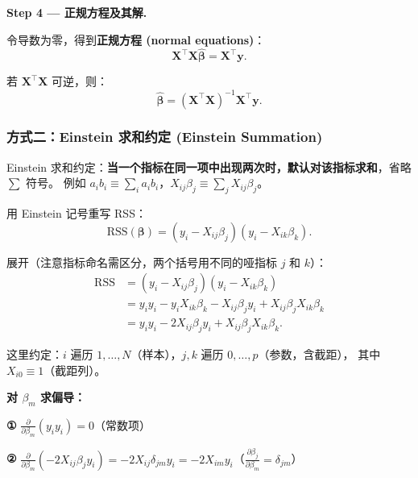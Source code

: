 \medskip
\textbf{Step 4 --- 正规方程及其解.}

令导数为零，得到\textbf{正规方程 (normal equations)}：
\begin{equation}\label{eq:normal_eq}
    \mathbf{X}^\top \mathbf{X} \hat{\bm{\beta}} = \mathbf{X}^\top \mathbf{y}.
\end{equation}

若 $\mathbf{X}^\top \mathbf{X}$ 可逆，则：
\begin{equation}\label{eq:beta_hat}
    \boxed{\hat{\bm{\beta}} = (\mathbf{X}^\top \mathbf{X})^{-1} \mathbf{X}^\top \mathbf{y}}.
\end{equation}

\subsubsection{方式二：Einstein 求和约定 (Einstein Summation)}

Einstein 求和约定：\textbf{当一个指标在同一项中出现两次时，默认对该指标求和}，省略 $\sum$ 符号。
例如 $a_i b_i \equiv \sum_i a_i b_i$，$X_{ij}\beta_j \equiv \sum_j X_{ij}\beta_j$。

用 Einstein 记号重写 RSS：
\begin{equation}\label{eq:rss_einstein}
    \mathrm{RSS}(\bm{\beta}) = (y_i - X_{ij}\beta_j)(y_i - X_{ik}\beta_k).
\end{equation}

展开（注意指标命名需区分，两个括号用不同的哑指标 $j$ 和 $k$）：
\begin{align}
    \mathrm{RSS} &= (y_i - X_{ij}\beta_j)(y_i - X_{ik}\beta_k) \nonumber\\
    &= y_i y_i - y_i X_{ik}\beta_k - X_{ij}\beta_j y_i + X_{ij}\beta_j X_{ik}\beta_k \nonumber\\
    &= y_i y_i - 2 X_{ij}\beta_j y_i + X_{ij}\beta_j X_{ik}\beta_k. \label{eq:rss_einstein_expanded}
\end{align}

这里约定：$i$ 遍历 $1,\dots,N$（样本），$j,k$ 遍历 $0,\dots,p$（参数，含截距），
其中 $X_{i0} \equiv 1$（截距列）。

\medskip
\textbf{对 $\beta_m$ 求偏导：}

\textbf{①} $\frac{\partial}{\partial \beta_m}(y_i y_i) = 0$\quad（常数项）

\textbf{②} $\frac{\partial}{\partial \beta_m}(-2 X_{ij}\beta_j y_i)
   = -2 X_{ij} \delta_{jm} y_i
   = -2 X_{im} y_i$\quad（$\frac{\partial \beta_j}{\partial \beta_m} = \delta_{jm}$）

